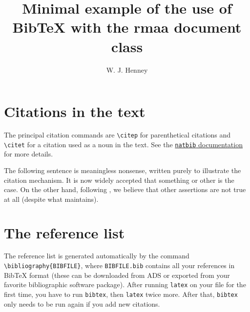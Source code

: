 \documentclass[guide]{rmaa}
\title{Minimal example of the use of Bib\TeX{} with the rmaa document class}
\author{W. J. Henney\altaffil{Centro de Radioastronomía y Astrofísica, UNAM, Mé\-xi\-co.}}
\begin{document}
\maketitle

\enlargethispage{-18\baselineskip}

\section{Citations in the text}
The principal citation commands are \verb|\citep| for parenthetical citations and \verb|\citet| for a citation used as a noun in the text. See the \href{http://mirror.ctan.org/macros/latex/contrib/natbib/natnotes.pdf}{ \texttt{natbib} documentation} for more details. 

The following sentence is meaningless nonsense, written purely to illustrate the citation mechanism. It is now widely accepted \citep{1991ApJ...374..580B, 2005MNRAS.358..291D} that something or other is the case. On the other hand, following \citet{1996ApJ...469..171G}, we believe that other assertions are not true at all (despite what \citealp{1939ApJ....89..526S} maintains).

\section{The reference list}
The reference list is generated automatically by the command \verb|\|\texttt{bib\-lio\-gra\-phy\-\{BIBFILE\}}, where \texttt{BIBFILE.bib} contains all your references in Bib\TeX{} format (these can be downloaded from ADS or exported from your favorite bibliographic software package). After running \texttt{latex} on your file for the first time, you have to run \texttt{bibtex}, then \texttt{latex} twice more. After that, \texttt{bibtex} only needs to be run again if you add new citations.

\bigskip

\end{document}
